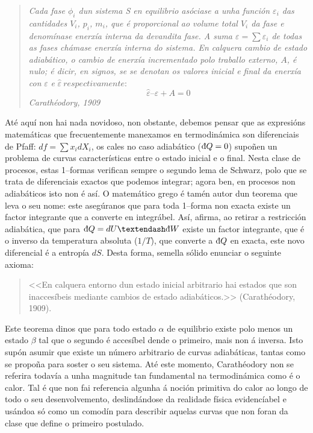 \begin{refsection}
\begin{multicols}{2}
\begin{quotation}
\textit{Cada fase $\phi_i$ dun sistema S en equilibrio asóciase a unha función
$\varepsilon_i$ das cantidades $V_i$, $p_i$, $m_i$, que é proporcional ao
volume total $V_i$ da fase e denomínase enerxía interna da devandita fase. A
suma $\varepsilon = \sum\varepsilon_i$ de todas as fases chámase enerxía
interna do sistema. En calquera cambio de estado adiabático, o cambio de
enerxía incrementado polo traballo externo, $A$, é nulo; é dicir, en signos, se
se denotan os valores inicial e final da enerxía con} $\varepsilon$ \textit{e}
$\hat{\varepsilon} ~\textit{respectivamente}$:  $$\hat{\varepsilon}
–\varepsilon + A = 0$$ \hspace{1cm}\textit{Carathéodory, 1909}
\end{quotation}

Até aquí non hai nada novidoso, non obstante, debemos pensar que as expresións
matemáticas que frecuentemente manexamos en termodinámica son diferenciais de
Pfaff: $df=\sum x_i dX_i$, os cales no caso adiabático ($\dbar Q = 0$) supoñen
un problema de curvas características entre o estado inicial e o final. Nesta
clase de procesos, estas 1–formas verifican sempre o segundo lema de Schwarz,
polo que se trata de diferenciais exactos que podemos integrar; agora ben, en
procesos non adiabáticos isto non é así. O matemático grego é tamén autor dun
teorema que leva o seu nome: este asegúranos que para toda 1–forma non exacta
existe un factor integrante que a converte en integrábel. Así, afirma, ao
retirar a restricción adiabática, que para $\dbar Q = dU – \dbar W$ existe un
factor integrante, que é o inverso da temperatura absoluta ($1/T$), que
converte a $\dbar Q$ en exacta, este novo diferencial é a entropía $dS$. Desta
forma, semella sólido enunciar o seguinte axioma:

\begin{quotation}
<<En calquera entorno dun estado inicial arbitrario hai estados que son
inaccesíbeis mediante cambios de estado adiabáticos.>> (Carathéodory, 1909).
\end{quotation}

Este teorema dinos que para todo estado $\alpha$ de equilibrio existe polo
menos un estado $\beta$ tal que o segundo é accesíbel dende o primeiro, mais
non á inversa. Isto supón asumir que existe un número arbitrario de curvas
adiabáticas, tantas como se propoña para soster o seu sistema. Até este
momento, Carathéodory non se referira todavía a unha magnitude tan fundamental
na termodinámica como é o calor. Tal é que non fai referencia algunha á noción
primitiva do calor ao longo de todo o seu desenvolvemento, deslindándose da
realidade física evidencíabel e usándoa só como un comodín para describir
aquelas curvas que non foran da clase que define o primeiro postulado.


\end{multicols}
\end{refsection}
